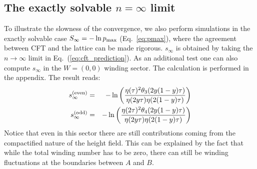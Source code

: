 \documentclass[11pt]{iopart}
\begin{document}
\subsection{The exactly solvable $n=\infty$ limit}
\label{sec:exact}
To illustrate the slowness of the convergence, we also perform simulations in the exactly solvable case $S_\infty=-\ln p_{\rm max}$ (Eq.~\ref{eq:pmax}), where the agreement between CFT and the lattice can be made rigorous. $s_{\infty}$ is obtained by taking the $n\to \infty$ limit in Eq.~(\ref{eq:cft_prediction}). 
As an additional test one can also compute $s_\infty$ in the $W=(0,0)$ winding sector. The calculation is performed in the appendix. The result reads:
\begin{eqnarray}\label{eq:cft_w0}
 s_\infty^{\rm (even)}&=&-\ln \left(\frac{\eta(\tau)^2\theta_3(2y(1-y)\tau)}{\eta(2y\tau)\eta(2(1-y)\tau)}\right)\\
 s_\infty^{\rm (odd)}&=&-\ln \left(\frac{\eta(2\tau)^2\theta_4(2y(1-y)\tau)}{\eta(2y\tau)\eta(2(1-y)\tau)}\right)
\end{eqnarray}
Notice that even in this sector there are still contributions coming from the compactified nature of the height field. This can be explained by the fact that while the total winding number has to be zero, there can still be winding fluctuations at the boundaries between $A$ and $B$. 
\end{document}
